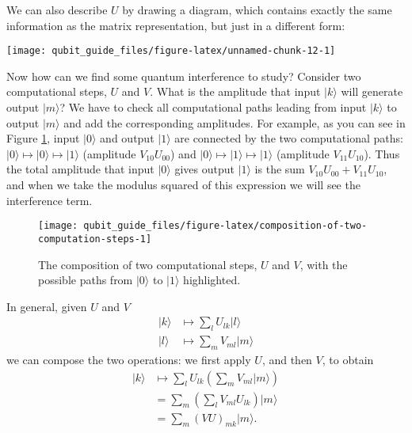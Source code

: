 \documentclass[fleqn]{article}
\begin{document}
We can also describe \(U\) by drawing a diagram, which contains exactly the same information as the matrix representation, but just in a different form:

\begin{center}\texttt{[image: qubit\_guide\_files/figure-latex/unnamed-chunk-12-1]} \end{center}

Now how can we find some quantum interference to study?
Consider two computational steps, \(U\) and \(V\).
What is the amplitude that input \(|k\rangle\) will generate output \(|m\rangle\)?
We have to check all computational paths leading from input \(|k\rangle\) to output \(|m\rangle\) and add the corresponding amplitudes.
For example, as you can see in Figure \ref{fig:composition-of-two-computation-steps}, input \(|0\rangle\) and output \(|1\rangle\) are connected by the two computational paths: \(|0\rangle\mapsto|0\rangle\mapsto|1\rangle\) (amplitude \(V_{10}U_{00}\)) and \(|0\rangle\mapsto|1\rangle\mapsto|1\rangle\) (amplitude \(V_{11}U_{10}\)).
Thus the total amplitude that input \(|0\rangle\) gives output \(|1\rangle\) is the sum \(V_{10}U_{00}+V_{11}U_{10}\), and when we take the modulus squared of this expression we will see the interference term.



\begin{figure}[H]

{\centering \texttt{[image: qubit\_guide\_files/figure-latex/composition-of-two-computation-steps-1]} 

}

\caption{The composition of two computational steps, \(U\) and \(V\), with the possible paths from \(|0\rangle\) to \(|1\rangle\) highlighted.}\label{fig:composition-of-two-computation-steps}
\end{figure}

In general, given \(U\) and \(V\)
\[
  \begin{aligned}
    |k\rangle
    &\longmapsto
    \sum_l U_{lk}|l\rangle
  \\|l\rangle
    &\longmapsto
    \sum_m V_{ml}|m\rangle
  \end{aligned}
\]
we can compose the two operations: we first apply \(U\), and then \(V\), to obtain
\[
  \begin{aligned}
    |k\rangle
    &\longmapsto
    \sum_l U_{lk} \left(
      \sum_m V_{ml}|m\rangle
    \right)
  \\&=
    \sum_m \left(
      \sum_l V_{ml}U_{lk}
    \right) |m\rangle
  \\&=
    \sum_m (VU)_{mk} |m\rangle.
  \end{aligned}
\]
\end{document}
